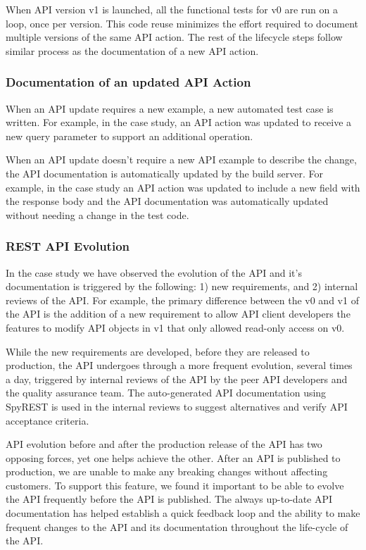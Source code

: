 \documentclass[10pt, conference]{IEEEtran}
\begin{document}
When API version v1 is launched, all the functional tests for v0 are run on a loop, once per version. This code reuse minimizes the effort required to document multiple versions of the same API action. The rest of the lifecycle steps follow similar process as the documentation of a new API action.

\subsubsection{Documentation of an updated API Action}
When an API update requires a new example, a new automated test case is written. For example, in the case study, an API action was updated to receive a new query parameter to support an additional operation.

When an API update doesn't require a new API example to describe the change, the API documentation is automatically updated by the build server. For example, in the case study an API action was updated to include a new field with the response body and the API documentation was automatically updated without needing a change in the test code.

\subsubsection{REST API Evolution} %
\label{sub:rest_api_evolution}
In the case study we have observed the evolution of the API and it's documentation is triggered by the following: 1) new requirements, and 2) internal reviews of the API. For example, the primary difference between the v0 and v1 of the API is the addition of a new requirement to allow API client developers the features to modify API objects in v1 that only allowed read-only access on v0.

While the new requirements are developed, before they are released to production, the API undergoes through a more frequent evolution, several times a day, triggered by internal reviews of the API by the peer API developers and the quality assurance team. The auto-generated API documentation using SpyREST is used in the internal reviews to suggest alternatives and verify API acceptance criteria.

API evolution before and after the production release of the API has two opposing forces, yet one helps achieve the other. After an API is published to production, we are unable to make any breaking changes without affecting customers. To support this feature, we found it important to be able to evolve the API frequently before the API is published. The always up-to-date API documentation has helped establish a quick feedback loop and the ability to make frequent changes to the API and its documentation throughout the life-cycle of the API.
\end{document}
